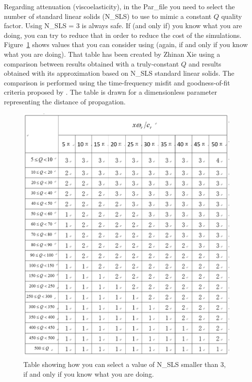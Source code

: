 Regarding attenuation (viscoelasticity), in the Par\_file you need to select the number of standard linear solids (N\_SLS) to use to mimic a constant $Q$ quality factor.
Using N\_SLS = 3 is always safe. If (and only if) you know what you are doing, you can try to reduce that in order to reduce the cost of the simulations.
Figure~\ref{fig:selectNSLS} shows values that you can consider using (again, if and only if you know what you are doing). That table has been created by Zhinan Xie using
a comparison between results obtained with a truly-constant $Q$ and results obtained with its approximation based on N\_SLS standard linear solids.
The comparison is performed using the time-frequency misfit and goodness-of-fit criteria proposed by \cite{Kristekova_2009}.
The table is drawn for a dimensionless parameter representing the distance of propagation.
\begin{figure}[htbp]
\centering
\includegraphics[width=5in]{figures/minimum_number_of_SLS_that_can_be_used_in_viscoelastic_simulation.png}
\caption{Table showing how you can select a value of N\_SLS smaller than 3, if and only if you know what you are doing.}
\label{fig:selectNSLS}
\end{figure}


